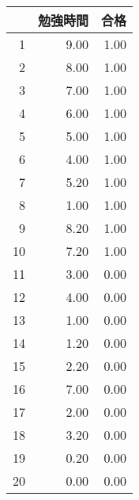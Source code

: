 \begin{table}[ht]
\centering
\begin{tabular}{rrr}
  \hline
 & 勉強時間 & 合格 \\ 
  \hline
1 & 9.00 & 1.00 \\ 
  2 & 8.00 & 1.00 \\ 
  3 & 7.00 & 1.00 \\ 
  4 & 6.00 & 1.00 \\ 
  5 & 5.00 & 1.00 \\ 
  6 & 4.00 & 1.00 \\ 
  7 & 5.20 & 1.00 \\ 
  8 & 1.00 & 1.00 \\ 
  9 & 8.20 & 1.00 \\ 
  10 & 7.20 & 1.00 \\ 
  11 & 3.00 & 0.00 \\ 
  12 & 4.00 & 0.00 \\ 
  13 & 1.00 & 0.00 \\ 
  14 & 1.20 & 0.00 \\ 
  15 & 2.20 & 0.00 \\ 
  16 & 7.00 & 0.00 \\ 
  17 & 2.00 & 0.00 \\ 
  18 & 3.20 & 0.00 \\ 
  19 & 0.20 & 0.00 \\ 
  20 & 0.00 & 0.00 \\ 
   \hline
\end{tabular}
\end{table}
